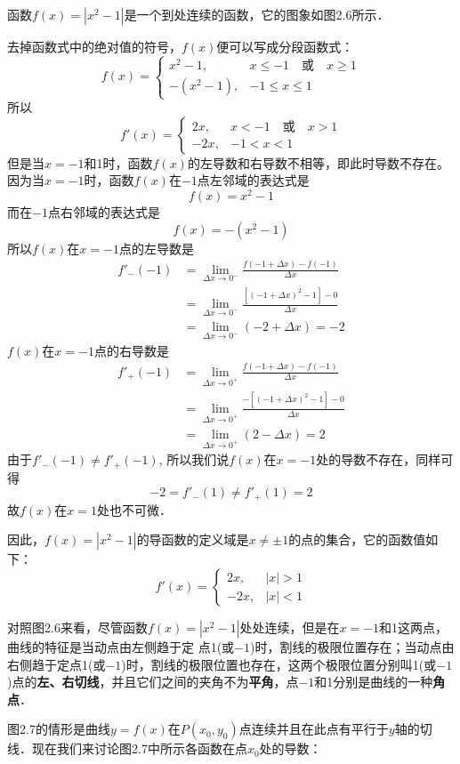     
\begin{solution}
函数$f(x)=|x^2-1|$是一个到处连续的函数，它的图象如图2.6所示．

去掉函数式中的绝对值的符号，$f(x)$便可以写成分段函数式：
\[f(x)=\begin{cases}
    x^2-1,& x\le -1\quad \text{或}\quad x\ge 1\\
    -(x^2-1), & -1\le x\le 1
\end{cases}\]
所以
\[f'(x)=\begin{cases}
    2x ,&  x< -1\quad \text{或}\quad x> 1\\
    -2x,& -1<x<1
\end{cases}\]
但是当$x=-1$和1时，函数$f(x)$的左导数和右导数不相等，即此时导数不存在。因为当$x=-1$时，函数$f(x)$在$-1$点左邻域的表达式是
\[f (x) =x^2-1\]
而在$-1$点右邻域的表达式是
\[f (x) =- (x^2-1)\]
所以$f(x)$在$x=-1$点的左导数是
\[\begin{split}
    f'_-(-1)&=\lim_{\Delta x\to 0^-}\frac{f(-1+\Delta x)-f(-1)}{\Delta x}\\
    &=\lim_{\Delta x\to 0^-}\frac{[(-1+\Delta x)^2-1]-0}{\Delta x}\\
    &=\lim_{\Delta x\to 0^-}(-2+\Delta x)=-2
\end{split}\]
$f(x)$在$x=-1$点的右导数是
\[\begin{split}
    f'_+(-1)&=\lim_{\Delta x\to 0^+}\frac{f(-1+\Delta x)-f(-1)}{\Delta x}\\
    &=\lim_{\Delta x\to 0^+}\frac{-[(-1+\Delta x)^2-1]-0}{\Delta x}\\
    &=\lim_{\Delta x\to 0^+}(2-\Delta x)=2 
\end{split}\]
由于$f'_-(-1)\ne f'_+(-1)$, 所以我们说$f(x)$在$x=-1$处的导数不存在，同样可得
\[-2=f'_- (1)\ne f'_+(1)=2\]
故$f(x)$在$x=1$处也不可微．

因此，$f(x)=|x^2-1|$的导函数的定义域是$x\ne\pm 1$的点的集合，它的函数值如下：
\[f'(x)=\begin{cases}
    2x,& |x|>1\\
    -2x,& |x|<1
\end{cases}\]
\end{solution}

对照图2.6来看，尽管函数$f(x)=|x^2-1|$处处连续，但是在$x=-1$和1这两点，曲线的特征是当动点由左侧趋于定
点1(或$-1$)时，割线的极限位置存在；当动点由右侧趋于定点1(或$-1$)时，割线的极限位置也存在，这两个极限位置分别叫1(或$-1$)点的\textbf{左、右切线}，并且它们之间的夹角不为\textbf{平角}，点$-1$和1分别是曲线的一种\textbf{角点}．
    
图2.7的情形是曲线$y=f(x)$在$P(x_0,y_0)$点连续并且在此点有平行于$y$轴的切线．现在我们来讨论图2.7中所示各函数在点$x_0$处的导数：

